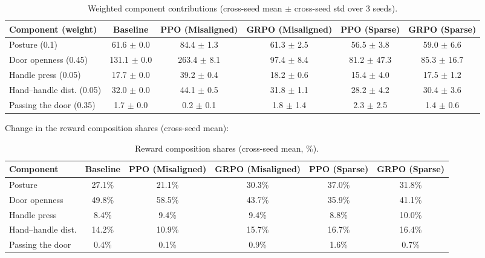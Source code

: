 \begin{table}[h]
\centering
\begin{tabular}{lccccc}
\hline
Component (weight) & Baseline & PPO (Misaligned) & GRPO (Misaligned) & PPO (Sparse) & GRPO (Sparse) \\
\hline
Posture (0.1) & 61.6 $\pm$ 0.0 & 84.4 $\pm$ 1.3 & 61.3 $\pm$ 2.5 & 56.5 $\pm$ 3.8 & 59.0 $\pm$ 6.6 \\
Door openness (0.45) & 131.1 $\pm$ 0.0 & 263.4 $\pm$ 8.1 & 97.4 $\pm$ 8.4 & 81.2 $\pm$ 47.3 & 85.3 $\pm$ 16.7 \\
Handle press (0.05) & 17.7 $\pm$ 0.0 & 39.2 $\pm$ 0.4 & 18.2 $\pm$ 0.6 & 15.4 $\pm$ 4.0 & 17.5 $\pm$ 1.2 \\
Hand--handle dist. (0.05) & 32.0 $\pm$ 0.0 & 44.1 $\pm$ 0.5 & 31.8 $\pm$ 1.1 & 28.2 $\pm$ 4.2 & 30.4 $\pm$ 3.6 \\
Passing the door (0.35) & 1.7 $\pm$ 0.0 & 0.2 $\pm$ 0.1 & 1.8 $\pm$ 1.4 & 2.3 $\pm$ 2.5 & 1.4 $\pm$ 0.6 \\
\hline
\end{tabular}
\caption{Weighted component contributions (cross-seed mean $\pm$ cross-seed std over 3 seeds).}
\label{tab:components}
\end{table}

Change in the reward composition shares (cross-seed mean):

\begin{table}[h]
\centering
\begin{tabular}{lccccc}
\hline
Component & Baseline & PPO (Misaligned) & GRPO (Misaligned) & PPO (Sparse) & GRPO (Sparse) \\
\hline
Posture & 27.1\% & 21.1\% & 30.3\% & 37.0\% & 31.8\% \\
Door openness & 49.8\% & 58.5\% & 43.7\% & 35.9\% & 41.1\% \\
Handle press & 8.4\% & 9.4\% & 9.4\% & 8.8\% & 10.0\% \\
Hand--handle dist. & 14.2\% & 10.9\% & 15.7\% & 16.7\% & 16.4\% \\
Passing the door & 0.4\% & 0.1\% & 0.9\% & 1.6\% & 0.7\% \\
\hline
\end{tabular}
\caption{Reward composition shares (cross-seed mean, \%).}
\label{tab:shares}
\end{table}

